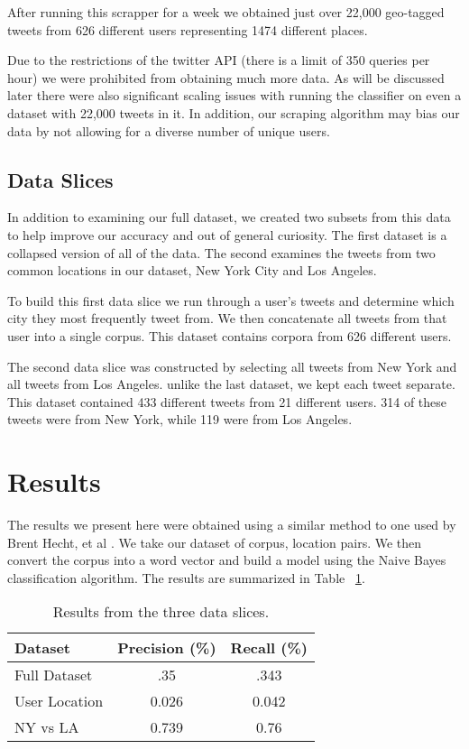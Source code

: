 \documentclass[12pt]{article}
\begin{document}
After running this scrapper for a week we obtained just over 22,000 geo-tagged tweets from 626 different users representing 1474 different places.

Due to the restrictions of the twitter API (there is a limit of 350 queries per hour) we were prohibited from obtaining much more data. As will be discussed later there were also significant scaling issues with running the classifier on even a dataset with 22,000 tweets in it. In addition, our scraping algorithm may bias our data by not allowing for a diverse number of unique users. 

\subsection*{Data Slices}
In addition to examining our full dataset, we created two subsets from this data to help improve our accuracy and out of general curiosity. The first dataset is a collapsed version of all of the data. The second examines the tweets from two common locations in our dataset, New York City and Los Angeles. 

To build this first data slice we run through a user's tweets and determine which city they most frequently tweet from. We then concatenate all tweets from that user into a single corpus. This dataset contains corpora from 626 different users. 

The second data slice was constructed by selecting all tweets from New York and all tweets from Los Angeles. unlike the last dataset, we kept each tweet separate. This dataset contained 433 different tweets from 21 different users. 314 of these tweets were from New York, while 119 were from Los Angeles. 

\section*{Results}
The results we present here were obtained using a similar method to one used by Brent Hecht, et al \cite{bhecht}. We take our dataset of corpus, location pairs. We then convert the corpus into a word vector and build a model using the Naive Bayes classification algorithm. The results are summarized in Table ~\ref{table:results}. 
\begin{table}
	\begin{center}
		\begin{tabular}{| l || c | c |}
			\hline
			Dataset & Precision (\%) & Recall (\%) \\ \hline
			Full Dataset & .35 & .343 \\ \hline
			User Location & 0.026 & 0.042 \\ \hline
			NY vs LA & 0.739 & 0.76 \\
			\hline
		\end{tabular}
	\end{center}
	\caption{Results from the three data slices.}
	\label{table:results}
\end{table}
\end{document}
